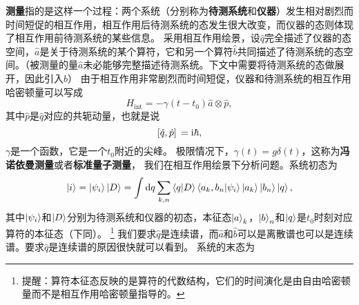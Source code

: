 \documentclass[hyperref, UTF8, a4paper]{ctexart}
\newcommand*{\ii}{\mathrm{i}}
\begin{document}
\textbf{测量}指的是这样一个过程：两个系统（分别称为\textbf{待测系统}和\textbf{仪器}）发生相对剧烈而时间短促的相互作用，相互作用后待测系统的态发生很大改变，而仪器的态则体现了相互作用前待测系统的某些信息。
采用相互作用绘景，设$\hat{q}$完全描述了仪器的态空间，$\hat{a}$是关于待测系统的某个算符，它和另一个算符$\hat{b}$共同描述了待测系统的态空间。（被测量的量$\hat{a}$未必能够完整描述待测系统。下文中需要将待测系统的态做展开，因此引入$\hat{b}$）
由于相互作用非常剧烈而时间短促，仪器和待测系统的相互作用哈密顿量可以写成
\begin{equation}
    H_\text{int} = - \gamma(t-t_0) \hat{a} \otimes \hat{p},
\end{equation}
其中$\hat{p}$是$\hat{q}$对应的共轭动量，也就是说
\[
    \comm*{\hat{q}}{\hat{p}} = \ii \hbar,
\]
$\gamma$是一个函数，它是一个$t_0$附近的尖峰。
极限情况下，$\gamma(t) = g \delta(t)$，这称为\textbf{冯诺依曼测量}或者\textbf{标准量子测量}，
我们在相互作用绘景下分析问题。系统初态为
\[
    \ket{i} = \ket{\psi_i} \ket{D} = \int \dd{q} \sum_{k, n} \braket{q}{D} \braket{a_k, b_n}{\psi_i} \ket{a_k} \ket{b_n} \ket{q},
\]
其中$\ket{\psi_i}$和$\ket{D}$分别为待测系统和仪器的初态，本征态$\ket{a}_k$，$\ket{b}_n$和$\ket{q}$是$t_0$时刻对应算符的本征态（下同）。%
\footnote{提醒：算符本征态反映的是算符的代数结构，它们的时间演化是由自由哈密顿量而不是相互作用哈密顿量指导的。}%
我们要求$\hat{q}$是连续谱，而$\hat{a}$和$\hat{b}$可以是离散谱也可以是连续谱。要求$\hat{q}$是连续谱的原因很快就可以看到。
系统的末态为
\end{document}
